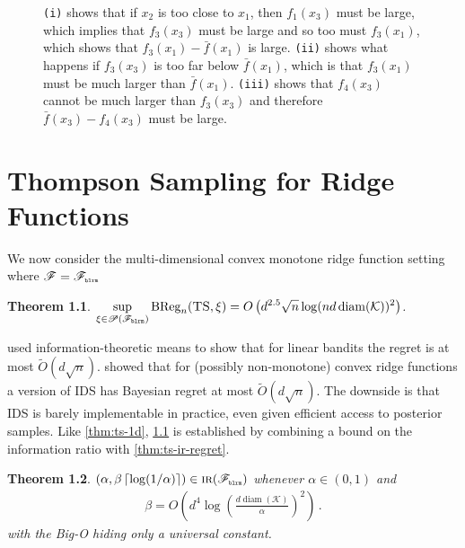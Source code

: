 \documentclass[letter, 12pt]{report}
\newcommand{\pr}{\text{\tiny\texttt{r}}}
\newcommand{\pb}{\text{\tiny\texttt{b}}}
\newcommand{\pl}{\text{\tiny\texttt{l}}}
\renewcommand{\pm}{\text{\tiny\texttt{m}}}
\newcommand{\ceil}[1]{\left\lceil #1 \right\rceil}
\newcommand{\BReg}{\textrm{BReg}}
\newcommand{\cK}{\mathcal K}
\newcommand{\sF}{\mathscr F}
\newcommand{\sP}{\mathscr P}
\newcommand{\diam}{\operatorname{diam}}
\newcommand{\1}{\mathbf{1}}
\newcommand{\IR}{\operatorname{\textsc{ir}}}
\newcommand{\ts}{\textsc{TS}\xspace}
\newcommand{\IDS}{\textsc{IDS}}
\theoremstyle{plain}
\newtheorem{theorem}{Theorem}
\theoremstyle{definition}
\theoremstyle{remark}
\begin{document}
\begin{figure}[h!]

    \caption{
        \texttt{(i)} shows that if $x_2$ is too close to $x_1$, then $f_1(x_3)$ must be large, which implies that $f_3(x_3)$ must be large
        and so too must $f_3(x_1)$, which shows that $f_3(x_1) - \bar f(x_1)$ is large.
        \texttt{(ii)} shows what happens if $f_3(x_3)$ is too far below $\bar f(x_1)$, which is that $f_3(x_1)$ must be much larger than $\bar f(x_1)$.
        \texttt{(iii)} shows that $f_4(x_3)$ cannot be much larger than $f_3(x_3)$ and therefore $\bar f(x_3) - f_4(x_3)$ must be large.
    }
    \label{fig:ts}
\end{figure}

\chapter{Thompson Sampling for Ridge Functions}

We now consider the multi-dimensional convex monotone ridge function setting where $\sF = \sF_{\pb\pl\pr\pm}$

\begin{theorem}\label{thm:ts-ridge}
    $\displaystyle \sup_{\xi \in \sP(\sF_{\pb\pl\pr\pm})} \BReg_n(\ts, \xi) = O\left(d^{2.5} \sqrt{n} \log(n d \diam(\cK))^2\right)$.
\end{theorem}

\cite{RV16} used information-theoretic means to show that for linear bandits the regret is at most $\tilde O(d \sqrt{n})$.
\cite{lattimore2021minimax} showed that for (possibly non-monotone) convex ridge functions a version of \IDS{} has Bayesian regret at most $\tilde O(d \sqrt{n})$.
The downside is that \IDS{} is barely implementable in practice, even given efficient access to posterior samples.
Like \cref{thm:ts-1d}, \cref{thm:ts-ridge} is established by combining a bound on the information ratio with \cref{thm:ts-ir-regret}.

\begin{theorem}\label{thm:ridge-ir}
    $(\alpha, \beta \ceil{\log(1/\alpha)}) \in \IR(\sF_{\pb\pl\pr\pm})$ whenever $\alpha \in (0,1)$ and
    \begin{align*}
        \beta = O\left(d^4 \log\left(\frac{d \diam(\cK)}{\alpha}\right)^2\right) \,.
    \end{align*}
    with the Big-O hiding only a universal constant.
\end{theorem}
\end{document}
